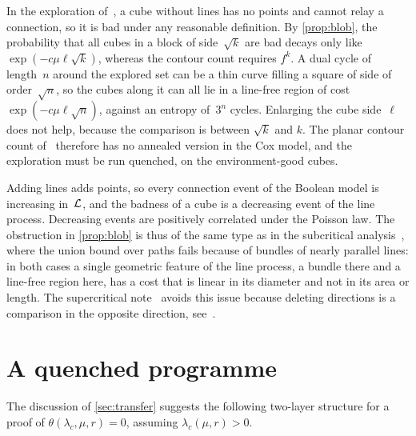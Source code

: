 \documentclass[11pt,letterpaper]{article}
\begin{document}
In the exploration of~\cite{Pei26}, a cube without lines has no points and cannot relay a connection, so it is bad under any reasonable definition. By \cref{prop:blob}, the probability that all cubes in a block of side~$\sqrt k$ are bad decays only like $\exp(-c\mu\ell\sqrt k)$, whereas the contour count requires $f^k$. A dual cycle of length~$n$ around the explored set can be a thin curve filling a square of side of order~$\sqrt n$, so the cubes along it can all lie in a line-free region of cost $\exp(-c\mu\ell\sqrt n)$, against an entropy of~$3^n$ cycles. Enlarging the cube side~$\ell$ does not help, because the comparison is between $\sqrt k$ and $k$. The planar contour count of~\cite[Lemma~2.3]{Pei26} therefore has no annealed version in the Cox model, and the exploration must be run quenched, on the environment-good cubes.

\begin{remark}
\label{rem:monotone}
Adding lines adds points, so every connection event of the Boolean model is increasing in~$\mathcal L$, and the badness of a cube is a decreasing event of the line process. Decreasing events are positively correlated under the Poisson law. The obstruction in \cref{prop:blob} is thus of the same type as in the subcritical analysis~\cite[Section~6]{HJ26sub}, where the union bound over paths fails because of bundles of nearly parallel lines: in both cases a single geometric feature of the line process, a bundle there and a line-free region here, has a cost that is linear in its diameter and not in its area or length. The supercritical note~\cite{HJ26} avoids this issue because deleting directions is a comparison in the opposite direction, see~\cite[Remark~6.1]{HJ26}.
\end{remark}

\section{A quenched programme}
\label{sec:programme}

The discussion of \cref{sec:transfer} suggests the following two-layer structure for a proof of $\theta(\lambda_c,\mu,r)=0$, assuming $\lambda_c(\mu,r)>0$.
\end{document}
